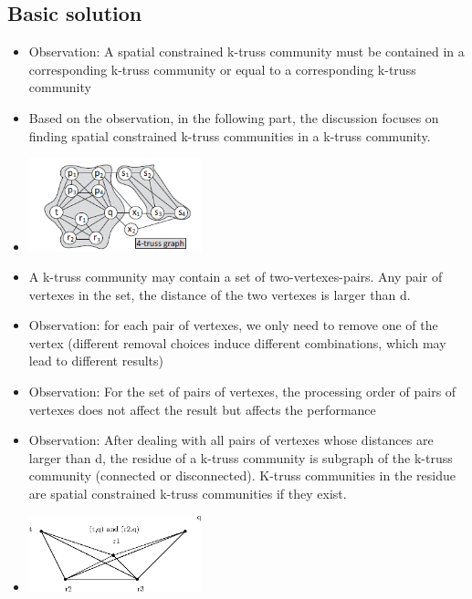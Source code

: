 \documentclass{beamer}
\begin{document}
\subsection{Basic solution}
\begin{frame}
\begin{itemize}
\item Observation: A spatial constrained k-truss community must be contained in a corresponding k-truss community or equal to a corresponding k-truss community 
\item Based on the observation, in the following part, the discussion focuses on finding spatial constrained k-truss communities in a k-truss community.
\item \includegraphics[width=5cm]{trusssample.jpg}
\end{itemize}
\end{frame}

\begin{frame}
\begin{itemize}
\item A k-truss community may contain a set of two-vertexes-pairs. Any pair of vertexes in the set, the distance of the two vertexes is larger than d.
\item Observation: for each pair of vertexes, we only need to remove one of the vertex (different removal choices induce different combinations, which may lead to different results)
\item Observation: For the set of pairs of vertexes, the processing order of pairs of vertexes does not affect the result but affects the performance
\item Observation: After dealing with all pairs of vertexes whose distances are larger than d, the residue of a k-truss community is subgraph of the k-truss community (connected or disconnected).
K-truss communities in the residue are spatial constrained k-truss communities if they exist.
\item \includegraphics[width=5cm]{subgraph.eps}
\end{itemize}
\end{frame}
\end{document}
